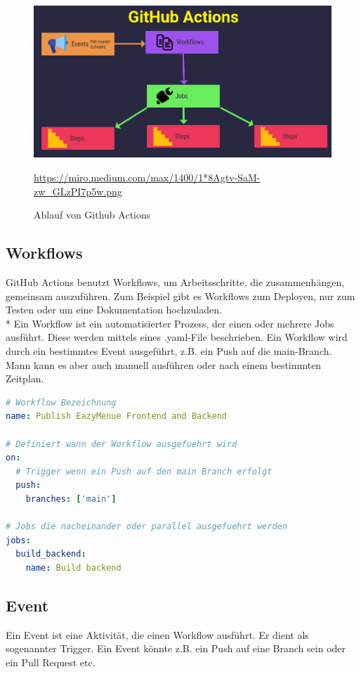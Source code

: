 \begin{figure}[htp]
    \centering
    \author{Percy Bolmer}
    \includegraphics[scale=0.4]{pics/gh_actions_grafik.png}
    \caption{Ablauf von Github Actions}
    \small \url{https://miro.medium.com/max/1400/1*8Agtv-SaM-zw_GLzPI7p5w.png} 
    \label{fig:impl:GHActionAb}
\end{figure}

\subsection{Workflows}
GitHub Actions benutzt Workflows, um Arbeitsschritte, die zusammenhängen, gemeinsam auszuführen. Zum Beispiel gibt es Workflows zum Deployen, nur zum Testen oder um eine Dokumentation hochzuladen.\\*
Ein Workflow ist ein automatisierter Prozess, der einen oder mehrere Jobs ausführt.
Diese werden mittels eines .yaml-File beschrieben. Ein Workflow wird durch ein bestimmtes Event ausgeführt, z.B. ein Push auf die main-Branch. Mann kann es aber auch manuell ausführen oder nach einem
bestimmten Zeitplan. \cite{GHAction}

\begin{lstlisting}[language=yaml,caption=Ausschnitt eines Workflow Files]
# Workflow Bezeichnung
name: Publish EazyMenue Frontend and Backend

# Definiert wann der Workflow ausgefuehrt wird 
on:
  # Trigger wenn ein Push auf den main Branch erfolgt
  push:
    branches: ['main']

# Jobs die nacheinander oder parallel ausgefuehrt werden
jobs:
  build_backend:
    name: Build backend
\end{lstlisting}

\subsection{Event}
Ein Event ist eine Aktivität, die einen Workflow ausführt. Er dient als sogenannter Trigger.
Ein Event könnte z.B. ein Push auf eine Branch sein oder ein Pull Request etc.\cite{GHAction}

